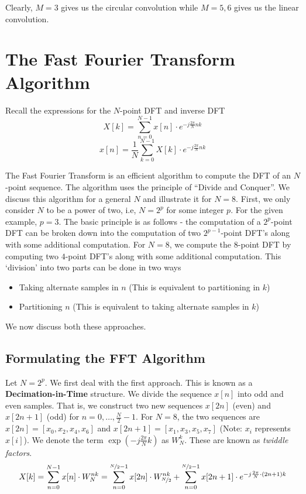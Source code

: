 \documentclass{article}
\theoremstyle{definition}
\begin{document}
Clearly, $M=3$ gives us the circular convolution while $M=5,6$ gives us the linear convolution.

\section{The Fast Fourier Transform Algorithm}
    
Recall the expressions for the $N$-point DFT and inverse DFT
\[
    X[k] = \sum_{n=0}^{N-1} x[n] \cdot e^{-j \frac{2\pi}{N}nk} 
\]
\[
    x[n] = \frac{1}{N}\sum_{k=0}^{N-1} X[k] \cdot e^{-j \frac{2\pi}{N}nk} 
\]

The Fast Fourier Transform is an efficient algorithm to compute the DFT of an $N$-point sequence. The algorithm uses the principle of ``Divide and Conquer''. We discuss this algorithm for a general $N$ and illustrate it for $N = 8$. First, we only consider $N$ to be a power of two, i.e, $N = 2^p$ for some integer $p$. For the given example, $p=3$. The basic principle is as follows - the computation of a $2^p$-point DFT can be broken down into the computation of two $2^{p-1}$-point DFT's along with some additional computation. For $N=8$, we compute the $8$-point DFT by computing two $4$-point DFT's along with some additional computation. This `division' into two parts can be done in two ways 
\begin{itemize}
    \item Taking alternate samples in $n$ (This is equivalent to partitioning in $k$)
    \item Partitioning $n$ (This is equivalent to taking alternate samples in $k$)
\end{itemize}

We now discuss both these approaches. 

\subsection{Formulating the FFT Algorithm}

Let $N=2^p$. We first deal with the first approach. This is known as a \textbf{Decimation-in-Time} structure. We divide the sequence $x[n]$ into odd and even samples. That is, we construct two new sequences $x[2n]$ (even) and $x[2n+1]$ (odd) for $n = 0, \ldots , \frac{N}{2} - 1$. For $N=8$, the two sequences are $x[2n] = [x_0, x_2, x_4, x_6 ]$ and $x[2n+1] = [ x_1 , x_3, x_5, x_7 ]$ (Note: $x_i$ represents $x[i]$). We denote the term $\exp \left(-j \frac{2\pi}{N}k \right)$ as $W_{N}^{k}$. These are known as \textit{twiddle factors}.
\[
    X[k] = \sum_{n=0}^{N-1} x[n] \cdot W_{N}^{nk} = \sum_{n=0}^{\nicefrac{N}{2}-1} x[2n] \cdot W_{\nicefrac{N}{2}}^{nk} + \sum_{n=0}^{\nicefrac{N}{2} - 1} x[2n+1] \cdot e^{-j \frac{2\pi}{N} \cdot (2n+1)k}
\]
\end{document}
